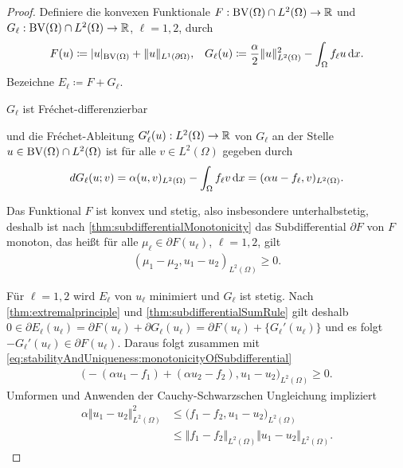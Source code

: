 \begin{proof}
  Definiere die konvexen Funktionale $F:\textup{BV}(\Omega)\cap L^2(\Omega)\to \mathbb{R}$
  und 
  $G_\ell:\textup{BV}(\Omega)\cap L^2(\Omega)\to \mathbb{R}$, $\ell=1,2$, durch
  \begin{align*}
    F(u) &\coloneqq |u|_{\textup{BV}(\Omega)} + \Vert u \Vert_{L^1(\partial\Omega)},&
    G_\ell(u)\coloneqq \frac{\alpha}{2}\Vert u\Vert_{L^2(\Omega)}^2 -
    \int_\Omega f_\ell u\,\mathrm{d}x.
  \end{align*}
  Bezeichne $E_\ell\coloneqq F+G_\ell$.

  $G_\ell$ ist Fr\'echet-differenzierbar 


  und die Fr\'echet-Ableitung $G_\ell'(u):
  L^2(\Omega)\to\mathbb{R}$ von $G_\ell$ an der
  Stelle
  $u\in \textup{BV}(\Omega)\cap L^2(\Omega)$ ist 
  für alle $v\in L^2(\Omega)$ gegeben durch
  \begin{align*}
    dG_\ell(u;v) = \alpha (u,v)_{L^2(\Omega)} - \int_\Omega f_\ell v\,\mathrm{d}x 
    = (\alpha u-f_\ell ,v)_{L^2(\Omega)}.
  \end{align*}

  Das Funktional $F$ ist konvex 
  und stetig, also insbesondere unterhalbstetig, deshalb 
  ist nach \cref{thm:subdifferentialMonotonicity} das
  Subdifferential
  $\partial F$ von $F$ monoton, das heißt für alle $\mu_\ell\in \partial
  F(u_\ell)$, $\ell=1,2$, gilt
  \begin{align}\label{eq:stabilityAndUniqueness:monotonicityOfSubdifferential}
    (\mu_1-\mu_2,u_1-u_2)_{L^2(\Omega)}\geq 0.
  \end{align}

  Für $\ell=1,2$ wird $E_\ell$ von $u_\ell$ minimiert und $G_\ell$ ist stetig.
  Nach \cref{thm:extremalprinciple} und
  \cref{thm:subdifferentialSumRule} gilt deshalb $0\in\partial E_\ell(u_\ell)
  = \partial F(u_\ell)+\partial G_\ell(u_\ell)=\partial F(u_\ell)+
  \{G_\ell'(u_\ell)\}$ 
  und es folgt
  $-G_\ell'(u_\ell)\in\partial F(u_\ell)$.
  Daraus folgt zusammen mit
  \eqref{eq:stabilityAndUniqueness:monotonicityOfSubdifferential}
  \begin{align*}
    \big( -(\alpha u_1 - f_1) + (\alpha u_2 - f_2), u_1 - u_2\big)_{L^2(\Omega)}
    \geq 0.
  \end{align*}
  Umformen und Anwenden der Cauchy-Schwarzschen Ungleichung impliziert
  \begin{align*}
    \alpha \Vert u_1 - u_2 \Vert_{L^2(\Omega)}^2
    &\leq
    \big(f_1 -f_2, u_1-u_2 \big)_{L^2(\Omega)}\\
    &\leq
    \Vert f_1-f_2\Vert_{L^2(\Omega)}\Vert u_1 - u_2\Vert_{L^2(\Omega)}.
  \end{align*}


\end{proof}
